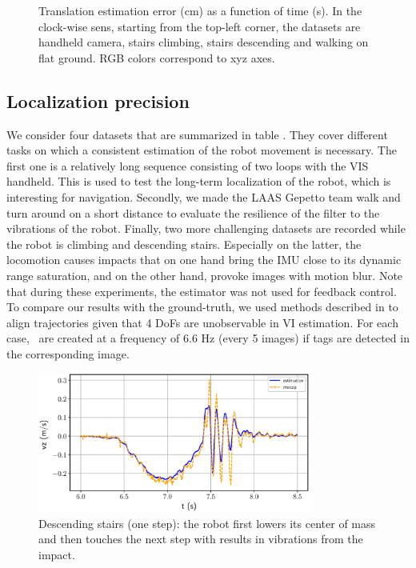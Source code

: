 \begin{figure}[t]
\begin{subfigure}{0.5\textwidth}
     \end{subfigure}%
    \caption{Translation estimation error (cm) as a function of time (s). In the clock-wise sens, starting from the 
             top-left corner, the datasets are handheld camera, stairs climbing, stairs descending and walking on flat ground. 
             RGB colors correspond to xyz axes.}
    \label{fig:results}
\end{figure}


\subsection{Localization precision}

We consider four datasets that are summarized in table . They cover different tasks on which a consistent 
estimation of the robot movement is necessary. The first one is a relatively long sequence consisting of two loops with the VIS handheld. 
This is used to test the long-term localization of the robot, which is interesting for navigation. Secondly, we made the LAAS Gepetto team 
 walk and turn around on a short distance to evaluate the resilience of the filter to the vibrations of the robot. Finally, two more 
challenging datasets are recorded while the robot is climbing and descending stairs. Especially on the latter, the locomotion causes impacts 
that on one hand bring the IMU close to its dynamic range saturation, and on the other hand, provoke images with motion blur. Note that during these experiments, 
the estimator was not used for feedback control. To compare our results with the ground-truth, we used methods described in \cite{zhang2018tutorial} to align 
trajectories given that 4 DoFs are unobservable in VI estimation.
For each case, \keyframes\ are created at a frequency of 6.6 Hz (every 5 images) if tags are detected in the corresponding image.

\begin{figure}[h]
    \centering
    \includegraphics[width=0.8\textwidth]{figures/absolute/vz_descending_onestep.eps}
    \caption{Descending stairs (one step): the robot first lowers its center of mass and then touches the next step with results in vibrations from the impact.}
    \label{fig:vz_descending_onestep}
\end{figure}

